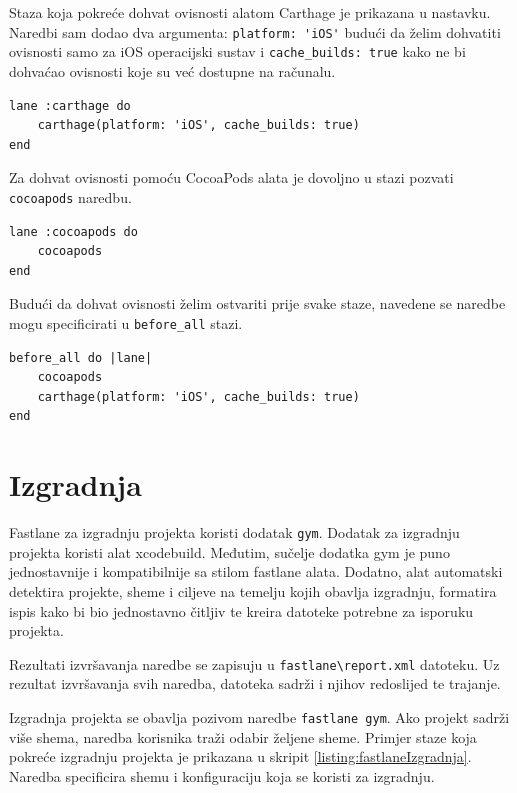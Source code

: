 \documentclass[times, utf8, diplomski, numeric]{fer}
\begin{document}
\begin{appendices}
Staza koja pokreće dohvat ovisnosti alatom Carthage je prikazana u nastavku. Naredbi sam dodao dva argumenta: \verb|platform: 'iOS'| budući da želim dohvatiti ovisnosti samo za iOS operacijski sustav i \verb|cache_builds: true| kako ne bi dohvaćao ovisnosti koje su već dostupne na računalu.

\begin{lstlisting}[caption=Dohvaćanje ovisnosti korištenjem carthage dodatka, label=fig:fastlaneCarthage]
lane :carthage do
    carthage(platform: 'iOS', cache_builds: true)
end
\end{lstlisting}

Za dohvat ovisnosti pomoću CocoaPods alata je dovoljno u stazi pozvati \verb|cocoapods| naredbu.

\begin{lstlisting}[caption=Dohvaćanje ovisnosti korištenjem cocoapods dodatka, label=fig:fastlaneCocoaPods]
lane :cocoapods do
    cocoapods
end
\end{lstlisting}

Budući da dohvat ovisnosti želim ostvariti prije svake staze, navedene se naredbe mogu specificirati u \verb|before_all| stazi.

\begin{lstlisting}[caption=Dohvat ovisnosti prije obavljanja svake staze]
before_all do |lane|
    cocoapods
    carthage(platform: 'iOS', cache_builds: true)
end
\end{lstlisting}

\section{Izgradnja}

Fastlane za izgradnju projekta koristi dodatak \verb|gym|\citep{fastlane:gym}. Dodatak za izgradnju projekta koristi alat xcodebuild. Međutim, sučelje dodatka gym je puno jednostavnije i kompatibilnije sa stilom fastlane alata. Dodatno, alat automatski detektira projekte, sheme i ciljeve na temelju kojih obavlja izgradnju, formatira ispis kako bi bio jednostavno čitljiv te kreira datoteke potrebne za isporuku projekta.

Rezultati izvršavanja naredbe se zapisuju u \verb|fastlane\report.xml| datoteku. Uz rezultat izvršavanja svih naredba, datoteka sadrži i njihov redoslijed te trajanje.

Izgradnja projekta se obavlja pozivom naredbe \verb|fastlane gym|. Ako projekt sadrži više shema, naredba korisnika traži odabir željene sheme. Primjer staze koja pokreće izgradnju projekta je prikazana u skripit \ref{listing:fastlaneIzgradnja}. Naredba specificira shemu i konfiguraciju koja se koristi za izgradnju.


\end{appendices}
\end{document}
